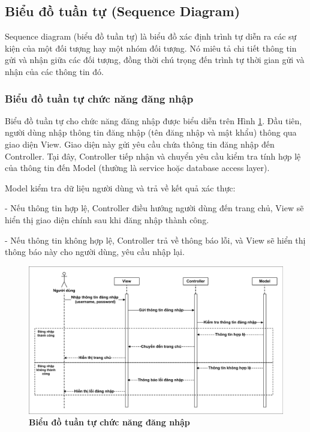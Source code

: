 \documentclass{article}
\begin{document}
	\subsection{Biểu đồ tuần tự (Sequence Diagram)}
	
	Sequence diagram (biểu đồ tuần tự) là biểu đồ xác định trình tự diễn ra các sự kiện của một đối tượng hay một nhóm đối tượng. Nó miêu tả chi tiết thông tin gửi và nhận giữa các đối tượng, đồng thời chú trọng đến trình tự thời gian gửi và nhận của các thông tin đó.
	
	\subsubsection{Biểu đồ tuần tự chức năng đăng nhập}
	
	Biểu đồ tuần tự cho chức năng đăng nhập được biểu diễn trên Hình \ref{fig315}. Đầu tiên, người dùng nhập thông tin đăng nhập (tên đăng nhập và mật khẩu) thông qua giao diện View. Giao diện này gửi yêu cầu chứa thông tin đăng nhập đến Controller. Tại đây, Controller tiếp nhận và chuyển yêu cầu kiểm tra tính hợp lệ của thông tin đến Model (thường là service hoặc database access layer).
	
	Model kiểm tra dữ liệu người dùng và trả về kết quả xác thực:
	
	- Nếu thông tin hợp lệ, Controller điều hướng người dùng đến trang chủ, View sẽ hiển thị giao diện chính sau khi đăng nhập thành công.
	
	- Nếu thông tin không hợp lệ, Controller trả về thông báo lỗi, và View sẽ hiển thị thông báo này cho người dùng, yêu cầu nhập lại.
	
	\begin{figure}[!ht]
		\centering
		\includegraphics[trim= 10pt 10pt 10pt 10pt, clip, width=16cm]{sequence_fig315.pdf}
		\caption [Biểu đồ tuần tự chức năng đăng nhập]{\bfseries \fontsize{12pt}{0pt}\selectfont Biểu đồ tuần tự chức năng đăng nhập}
		\label{fig315}
	\end{figure}
	
\end{document}
